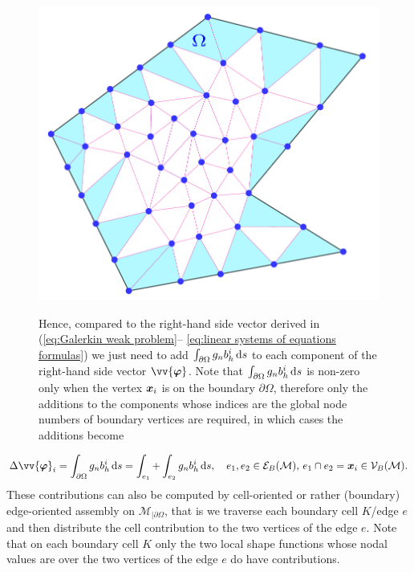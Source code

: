 	\begin{figure}[!htbp]
		\begin{minipage}{.2\textwidth}
			\includegraphics[width=1\linewidth]{svg/boundary_triangles}
		\end{minipage}%
		\begin{minipage}{.8\textwidth}
			\hspace{3ex}Hence, compared to the right-hand side vector derived 
			in (\ref{eq:Galerkin weak problem}--%
			\ref{eq:linear systems of equations formulas}) we just need to add 
			$\int_{\partial\Omega}g_n b_h^i\,\mathrm{d} s$ to each component of the 
			right-hand side vector $\vv{\bm{\varphi}}$. Note that 
			$\int_{\partial\Omega}g_n b_h^i\,\mathrm{d} s$	is non-zero only when the 
			vertex $\bm{x}_i$ is on the boundary $\partial\Omega$, therefore only 
			the additions to the components whose indices are the global node 
			numbers of boundary vertices are required, in which cases the 
			additions become			
		\end{minipage}
	\end{figure}
	\vspace{-10pt}
	\begin{equation}\label{eq:addition on boundary dofs of RHS}
		\Delta\vv{\bm{\varphi}}_i=
		\int_{\partial\Omega}g_n b_h^i\,\rd s=
		\int_{e_1}+\int_{e_2} g_n b_h^i\,\rd s,\quad 
		e_1,e_2\in\mathcal{E}_B(\mathcal{M}),\,
		e_1\cap e_2 = \bx_i\in\mathcal{V}_B(\mathcal{M}).
	\end{equation}
	These contributions can also be computed by cell-oriented or rather 
	(boundary) edge-oriented assembly on $\mathcal{M}_{|\partial\Omega}$, that
	is we traverse each boundary cell $K$/edge $e$ and then distribute the 
	cell contribution to the two vertices of the edge $e$. Note that on 
	each boundary cell $K$ only the two local shape functions whose nodal 
	values are over the two vertices of the edge $e$ do have contributions.
	
